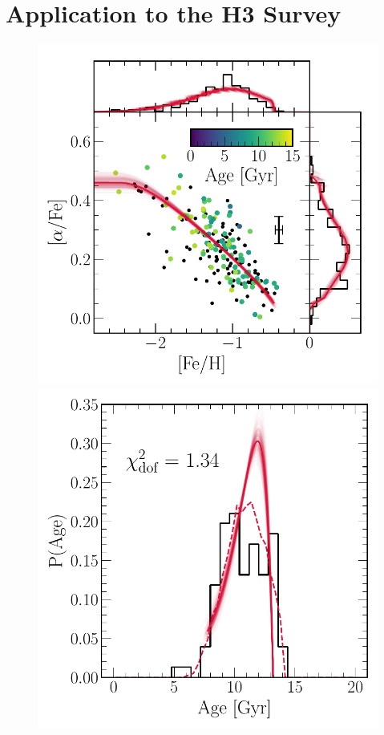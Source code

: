 \documentclass[ms.tex]{subfiles}
\begin{document}
\section{Application to the H3 Survey}
\label{sec:h3}

\begin{figure}
\includegraphics[scale = 0.5]{gsefit_afe_feh.pdf}
\includegraphics[scale = 0.42]{gsefit_agedist.pdf}

\end{figure}
\end{document}

